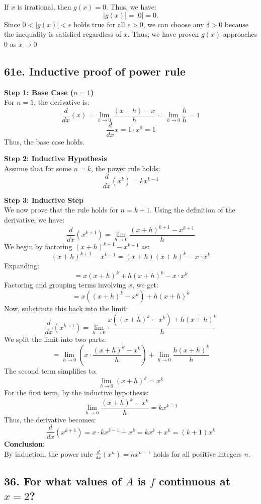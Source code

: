 \documentclass{article}
\begin{document}
If \(x\) is irrational, then \(g(x) = 0\). Thus, we have:
\[
|g(x)| = |0| = 0.
\]
Since \(0 < |g(x)| < \epsilon\) holds true for all \(\epsilon > 0\), we can choose any \(\delta > 0\) because the inequality is satisfied regardless of \(x\). Thus, we have proven $g(x)$ approaches 0 as $x \to 0$

\subsection*{61e. Inductive proof of power rule}


\textbf{Step 1: Base Case ($n = 1$)} \\
For $n = 1$, the derivative is:
\[
\frac{d}{dx}(x) = \lim_{h \to 0} \frac{(x+h) - x}{h} = \lim_{h \to 0} \frac{h}{h} = 1
\]
\[
\frac{d}{dx}x = 1 \cdot x^{0} = 1
\]
Thus, the base case holds.

\textbf{Step 2: Inductive Hypothesis} \\
Assume that for some $n = k$, the power rule holds:
\[
\frac{d}{dx}(x^k) = kx^{k-1}
\]

\textbf{Step 3: Inductive Step} \\
We now prove that the rule holds for $n = k+1$. Using the definition of the derivative, we have:
\[
\frac{d}{dx}(x^{k+1}) = \lim_{h \to 0} \frac{(x+h)^{k+1} - x^{k+1}}{h}
\]
We begin by factoring $(x+h)^{k+1} - x^{k+1}$ as:
\[
(x+h)^{k+1} - x^{k+1} = (x+h)(x+h)^k - x \cdot x^k
\]
Expanding:
\[
= x(x+h)^k + h(x+h)^k - x \cdot x^k
\]
Factoring and grouping terms involving $x$, we get:
\[
= x\left((x+h)^k - x^k\right) + h(x+h)^k
\]
Now, substitute this back into the limit:
\[
\frac{d}{dx}(x^{k+1}) = \lim_{h \to 0} \frac{x\left((x+h)^k - x^k\right) + h(x+h)^k}{h}
\]
We split the limit into two parts:
\[
= \lim_{h \to 0} \left( x \cdot \frac{(x+h)^k - x^k}{h} \right) + \lim_{h \to 0} \frac{h(x+h)^k}{h}
\]
The second term simplifies to:
\[
\lim_{h \to 0} (x+h)^k = x^k
\]
For the first term, by the inductive hypothesis:
\[
\lim_{h \to 0} \frac{(x+h)^k - x^k}{h} = kx^{k-1}
\]
Thus, the derivative becomes:
\[
\frac{d}{dx}(x^{k+1}) = x \cdot kx^{k-1} + x^k = kx^k + x^k = (k+1)x^k
\]
\newpage
\noindent\textbf{Conclusion:} \\
By induction, the power rule $\frac{d}{dx}(x^n) = nx^{n-1}$ holds for all positive integers $n$.

\subsection*{36. For what values of \( A \) is \( f \) continuous at \( x = 2 \)?}
\end{document}
